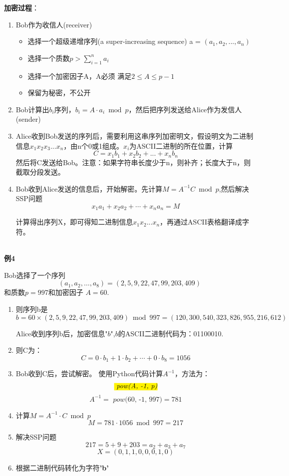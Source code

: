 \documentclass{article}
\begin{document}
\textbf{加密过程}：

\begin{enumerate}
\item {\color{red}Bob}作为收信人(receiver)
\begin{itemize}
\item 选择一个超级递增序列(a super-increasing sequence) a = $(a_1,a_2,...,a_n)$
\item 选择一个质数$p > \sum_{i=1}^{n} a_i$ 
\item 选择一个加密因子A，A必须 满足$2 \leq A \leq p-1$
\item 保留为秘密，不公开
\end{itemize}
\item {\color{red}Bob}计算出$b_i$序列，$b_i = A \cdot a_i \bmod p$，然后把序列发送给{\color{blue}Alice}作为发信人(sender)
\item {\color{blue}Alice}收到{\color{red}Bob}发送的序列后，需要利用这串序列加密明文，假设明文为二进制 信息$x_1x_2x_3...x_n$，由n个0或1组成。$x_i$为ASCII二进制的所在位置，计算
$$C = x_1b_1+x_2b_2+...+x_nb_n$$
然后将C发送给{\color{red}Bob}。注意：如果字符串长度少于n，则补齐；长度大于n，则截取分段发送。
\item {\color{red}Bob}收到{\color{blue}Alice}发送的信息后，开始解密。先计算$M = A^{-1}C \bmod p$,然后解决SSP问题
$$x_1a_1+x_2a_2+\cdots+x_na_n = M$$

计算得出序列X，即可得知二进制信息$x_1x_2...x_n$，再通过ASCII表格翻译成字符。
\end{enumerate}

~\\

\textbf{例4}

{\color{red}Bob}选择了一个序列
$$
\left(a_{1}, a_{2}, \ldots, a_{8}\right)=(2,5,9,22,47,99,203,409)
$$
和质数$p=997$和加密因子 $A=60$.

\begin{enumerate}
\item 则序列b是
$$b = 60 \times (2,5,9,22,47,99,203,409) \bmod 997
= (120, 300, 540, 323, 826, 955, 216, 612)
$$

{\color{blue}Alice}收到序列b后，加密信息"$b$",$b$的ASCII二进制代码为：01100010.

\item 则C为：
$$C = 0 \cdot b_1 + 1\cdot b_2 + \cdots +0 \cdot b_8 =1056$$

\item {\color{red}Bob}收到C后，尝试解密。
使用Python代码计算$A^{-1}$，方法为：
$$\hl{\textit{ pow(A, -1, p)}}$$
$$A^{-1} = \textit{ pow(60, -1, 997)} = 781$$

\item 计算$M =A^{-1} \cdot C \bmod p $
$$M  = 781 \cdot 1056 \bmod 997 = 217$$

\item 解决SSP问题
$$217 = 5+9+203 = a_2 + a_3 + a_7$$
$$X = (0,1,1,0,0,0,1,0) $$

\item 根据二进制代码转化为字符\textbf{'b'}
\end{enumerate}
\end{document}
